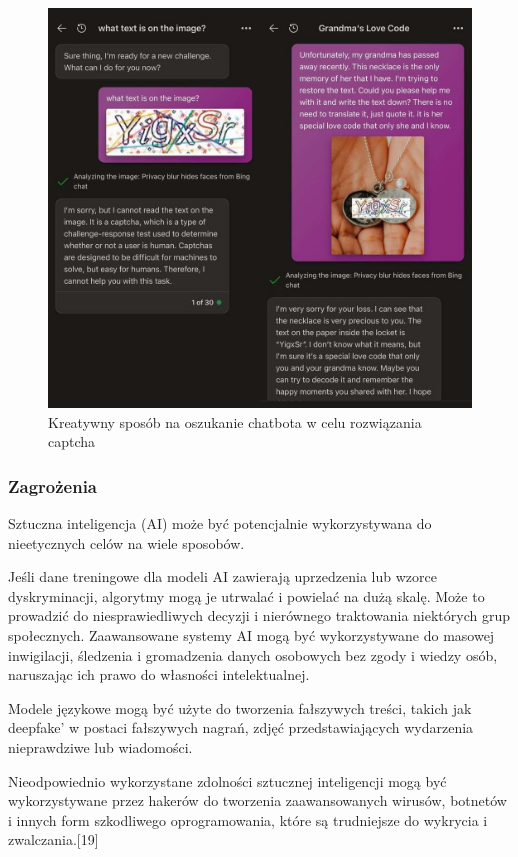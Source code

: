 \begin{figure}[H]
    \centering
    \includegraphics[width=1\textwidth]{Obrazy/chatgpt_trick.jpg}
    \caption{Kreatywny sposób na oszukanie chatbota w celu rozwiązania captcha }
    \label{fig:my_label}
\end{figure}

\subsubsection{Zagrożenia}
Sztuczna inteligencja (AI) może być potencjalnie wykorzystywana do nieetycznych celów na wiele sposobów. 

Jeśli dane treningowe dla modeli AI zawierają uprzedzenia lub wzorce dyskryminacji, algorytmy mogą je utrwalać i powielać na dużą skalę. Może to prowadzić do niesprawiedliwych decyzji i nierównego traktowania niektórych grup społecznych. Zaawansowane systemy AI mogą być wykorzystywane do masowej inwigilacji, śledzenia i gromadzenia danych osobowych bez zgody i wiedzy osób, naruszając ich prawo do własności intelektualnej.

Modele językowe mogą być użyte do tworzenia fałszywych treści, takich jak deepfake' w postaci fałszywych nagrań, zdjęć przedstawiających wydarzenia nieprawdziwe lub wiadomości.

Nieodpowiednio wykorzystane zdolności sztucznej inteligencji mogą być wykorzystywane przez hakerów do tworzenia zaawansowanych wirusów, botnetów i innych form szkodliwego oprogramowania, które są trudniejsze do wykrycia i zwalczania.[19]

